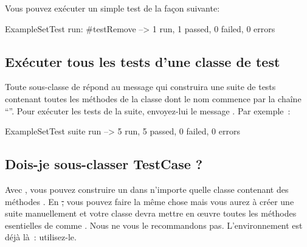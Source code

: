 \documentclass[a4paper,10pt,twoside]{book}
\begin{document}
Vous pouvez exécuter un simple test de la façon suivante:


\begin{code}{}
ExampleSetTest run: #testRemove --> 1 run, 1 passed, 0 failed, 0 errors
\end{code}

\subsection{Exécuter tous les tests d'une classe de test}

Toute sous-classe de  répond au message  qui construira une suite de tests contenant toutes les méthodes de la classe dont le nom commence par la chaîne ``''.
Pour exécuter les tests de la suite, envoyez-lui le message .
Par exemple~:

\begin{code}{}
ExampleSetTest suite run --> 5 run, 5 passed, 0 failed, 0 errors
\end{code}

\subsection{Dois-je sous-classer TestCase ?}
Avec \JUnit{}, vous pouvez construire un  dans n'importe quelle classe contenant des méthodes . En \st, vous pouvez faire la même chose mais vous aurez à créer une suite manuellement et votre classe devra mettre en {\oe}uvre toutes les méthodes esentielles de  comme .
Nous ne vous le recommandons pas. L'environnement est déjà là~: utilisez-le.
\end{document}
